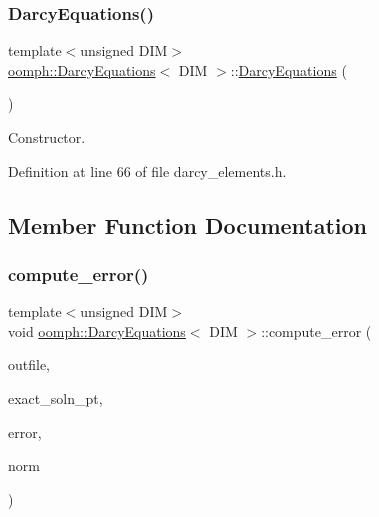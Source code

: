\subsubsection{\texorpdfstring{Darcy\+Equations()}{DarcyEquations()}}
{\footnotesize\ttfamily template$<$unsigned D\+IM$>$ \\
\hyperlink{classoomph_1_1DarcyEquations}{oomph\+::\+Darcy\+Equations}$<$ D\+IM $>$\+::\hyperlink{classoomph_1_1DarcyEquations}{Darcy\+Equations} (\begin{DoxyParamCaption}{ }\end{DoxyParamCaption})\hspace{0.3cm}{\ttfamily [inline]}}



Constructor. 



Definition at line 66 of file darcy\+\_\+elements.\+h.



\subsection{Member Function Documentation}
\mbox{\label{classoomph_1_1DarcyEquations_aafb8f62e6b3f584d28d7547e8d01b6d4}} 
\subsubsection{\texorpdfstring{compute\+\_\+error()}{compute\_error()}}
{\footnotesize\ttfamily template$<$unsigned D\+IM$>$ \\
void \hyperlink{classoomph_1_1DarcyEquations}{oomph\+::\+Darcy\+Equations}$<$ D\+IM $>$\+::compute\+\_\+error (\begin{DoxyParamCaption}\item[{std\+::ostream \&}]{outfile,  }\item[{\hyperlink{classoomph_1_1FiniteElement_a690fd33af26cc3e84f39bba6d5a85202}{Finite\+Element\+::\+Steady\+Exact\+Solution\+Fct\+Pt}}]{exact\+\_\+soln\+\_\+pt,  }\item[{\hyperlink{classoomph_1_1Vector}{Vector}$<$ double $>$ \&}]{error,  }\item[{\hyperlink{classoomph_1_1Vector}{Vector}$<$ double $>$ \&}]{norm }\end{DoxyParamCaption})\hspace{0.3cm}{\ttfamily [virtual]}}



